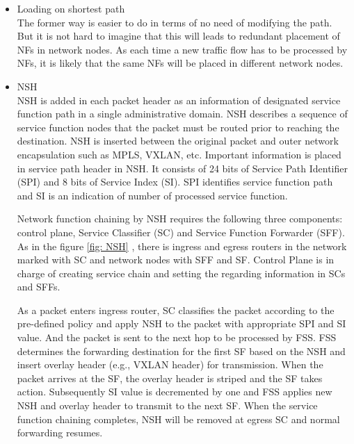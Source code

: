 	\begin{itemize}
		\item Loading on shortest path\\
			The former way is easier to do in terms of no need of modifying the path. But it is not hard to imagine that this will leads to redundant placement of NFs in network nodes. As each time a new traffic flow has to be processed by NFs, it is likely that the same NFs will be placed in different network nodes. 
		\item NSH\\
			NSH is added in each packet header as an information of designated service function path in a single administrative domain. NSH describes a sequence of service function nodes that the packet must be routed prior to reaching the destination. NSH is inserted between the original packet and outer network encapsulation such as MPLS, VXLAN, etc. Important information is placed in service path header in NSH. It consists of 24 bits of Service Path Identifier (SPI) and 8 bits of Service Index (SI). SPI identifies service function path and SI is an indication of number of processed service function. 
			
			Network function chaining by NSH requires the following three components: control plane, Service Classifier (SC) and Service Function Forwarder (SFF). As in the figure \ref{fig: NSH} , there is ingress and egress routers in the network marked with SC and network nodes with SFF and SF. Control Plane is in charge of creating service chain and setting the regarding information in SCs and SFFs. 
			
			As a packet enters ingress router, SC classifies the packet according to the pre-defined policy and apply NSH to the packet with appropriate SPI and SI value. And the packet is sent to the next hop to be processed by FSS. FSS determines the forwarding destination for the first SF based on the NSH and insert overlay header (e.g., VXLAN header) for transmission. When the packet arrives at the SF, the overlay header is striped and the SF takes action. Subsequently SI value is decremented by one and FSS applies new NSH and overlay header to transmit to the next SF. When the service function chaining completes, NSH will be removed at egress SC and normal forwarding resumes.   
			

\end{itemize}
